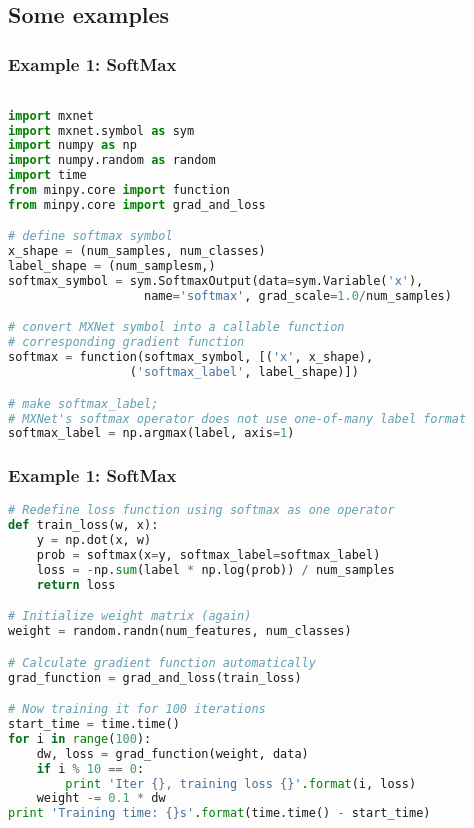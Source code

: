 \subsection{Some examples}

\begin{frame}[fragile]
  \MyLogo
  \frametitle{Example 1: SoftMax}  

\scriptsize{
\begin{lstlisting}[language=python]

import mxnet
import mxnet.symbol as sym
import numpy as np
import numpy.random as random
import time
from minpy.core import function
from minpy.core import grad_and_loss

# define softmax symbol
x_shape = (num_samples, num_classes)
label_shape = (num_samplesm,)
softmax_symbol = sym.SoftmaxOutput(data=sym.Variable('x'), 
                   name='softmax', grad_scale=1.0/num_samples)

# convert MXNet symbol into a callable function 
# corresponding gradient function
softmax = function(softmax_symbol, [('x', x_shape), 
                 ('softmax_label', label_shape)])

# make softmax_label; 
# MXNet's softmax operator does not use one-of-many label format
softmax_label = np.argmax(label, axis=1)
\end{lstlisting}
}
\end{frame}

\begin{frame}[fragile]
  \MyLogo
  \frametitle{Example 1: SoftMax}  
\ContinueLineNumber
\scriptsize{
\begin{lstlisting}[language=python]
# Redefine loss function using softmax as one operator
def train_loss(w, x):
    y = np.dot(x, w)
    prob = softmax(x=y, softmax_label=softmax_label)
    loss = -np.sum(label * np.log(prob)) / num_samples
    return loss

# Initialize weight matrix (again)
weight = random.randn(num_features, num_classes)

# Calculate gradient function automatically
grad_function = grad_and_loss(train_loss)

# Now training it for 100 iterations
start_time = time.time()
for i in range(100):
    dw, loss = grad_function(weight, data)
    if i % 10 == 0:
        print 'Iter {}, training loss {}'.format(i, loss)
    weight -= 0.1 * dw
print 'Training time: {}s'.format(time.time() - start_time)
\end{lstlisting}
}
\end{frame}